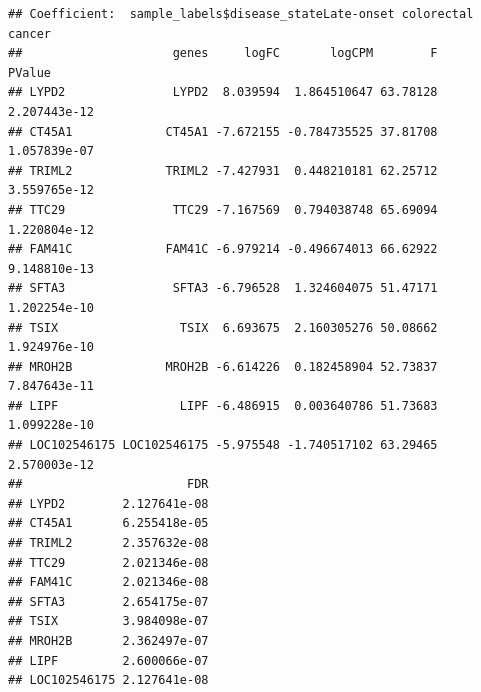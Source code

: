 \documentclass[
]{article}
\begin{document}
\begin{verbatim}
## Coefficient:  sample_labels$disease_stateLate-onset colorectal cancer 
##                     genes     logFC       logCPM        F       PValue
## LYPD2               LYPD2  8.039594  1.864510647 63.78128 2.207443e-12
## CT45A1             CT45A1 -7.672155 -0.784735525 37.81708 1.057839e-07
## TRIML2             TRIML2 -7.427931  0.448210181 62.25712 3.559765e-12
## TTC29               TTC29 -7.167569  0.794038748 65.69094 1.220804e-12
## FAM41C             FAM41C -6.979214 -0.496674013 66.62922 9.148810e-13
## SFTA3               SFTA3 -6.796528  1.324604075 51.47171 1.202254e-10
## TSIX                 TSIX  6.693675  2.160305276 50.08662 1.924976e-10
## MROH2B             MROH2B -6.614226  0.182458904 52.73837 7.847643e-11
## LIPF                 LIPF -6.486915  0.003640786 51.73683 1.099228e-10
## LOC102546175 LOC102546175 -5.975548 -1.740517102 63.29465 2.570003e-12
##                       FDR
## LYPD2        2.127641e-08
## CT45A1       6.255418e-05
## TRIML2       2.357632e-08
## TTC29        2.021346e-08
## FAM41C       2.021346e-08
## SFTA3        2.654175e-07
## TSIX         3.984098e-07
## MROH2B       2.362497e-07
## LIPF         2.600066e-07
## LOC102546175 2.127641e-08
\end{verbatim}
\end{document}
